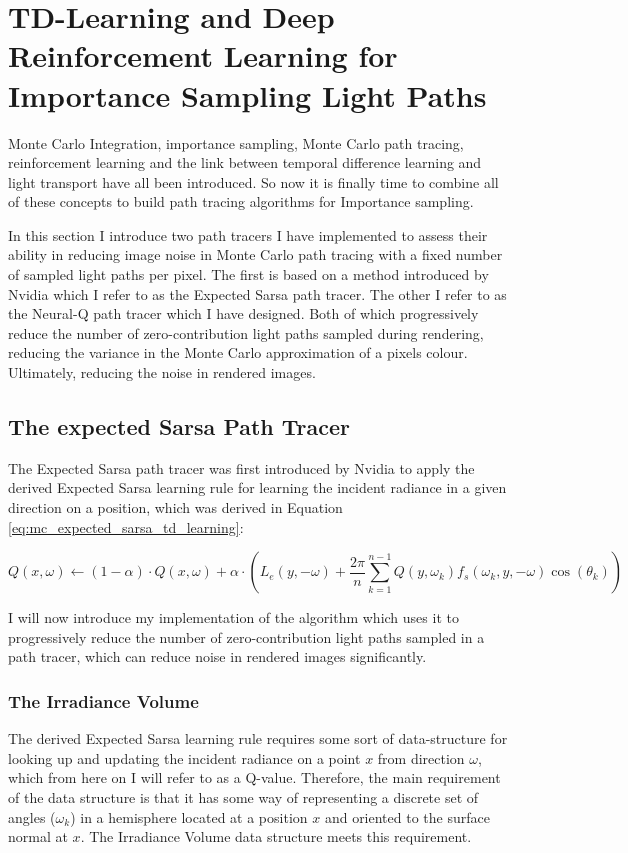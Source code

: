 \documentclass[../dissertation.tex]{subfiles}
\begin{document}
\chapter{TD-Learning and Deep Reinforcement Learning for Importance Sampling Light Paths}
\label{chap:td_deep_sampling}

Monte Carlo Integration, importance sampling, Monte Carlo path tracing, reinforcement learning and the link between temporal difference learning and light transport have all been introduced. So now it is finally time to combine all of these concepts to build path tracing algorithms for Importance sampling. 

In this section I introduce two path tracers I have implemented to assess their ability in reducing image noise in Monte Carlo path tracing with a fixed number of sampled light paths per pixel. The first is based on a method introduced by Nvidia \cite{dahm2017learning} which I refer to as the Expected Sarsa path tracer. The other I refer to as the Neural-Q path tracer which I have designed. Both of which progressively reduce the number of zero-contribution light paths sampled during rendering, reducing the variance in the Monte Carlo approximation of a pixels colour. Ultimately, reducing the noise in rendered images. 

\section{The expected Sarsa Path Tracer}
\label{sec:expecte_sarsa_path_tracer}

The Expected Sarsa path tracer was first introduced by Nvidia \cite{dahm2017learning} to apply the derived  Expected Sarsa learning rule for learning the incident radiance in a given direction on a position, which was derived in Equation \ref{eq:mc_expected_sarsa_td_learning}:

$$Q(x, \omega) \leftarrow (1 - \alpha) \cdot Q(x, \omega) + \alpha \cdot \left( L_e(y, -\omega) +\frac{2 \pi}{n} \sum_{k=1}^{n-1} Q(y, \omega_k) f_s(\omega_k, y, -\omega) \cos(\theta_k)  \right)$$

I will now introduce my implementation of the algorithm which uses it to progressively reduce the number of zero-contribution light paths sampled in a path tracer, which can reduce noise in rendered images significantly. 

\subsection{The Irradiance Volume}
The derived Expected Sarsa learning rule requires some sort of data-structure for looking up and updating the incident radiance on a point $x$ from direction $\omega$, which from here on I will refer to as a Q-value. Therefore, the main requirement of the data structure is that it has some way of representing a discrete set of angles ($\omega_k$) in a hemisphere located at a position $x$ and oriented to the surface normal at $x$. The Irradiance Volume data structure \cite{greger1998irradiance} meets this requirement.\\
\end{document}
